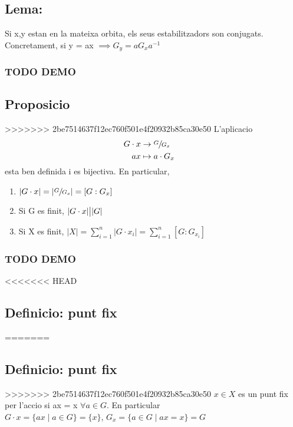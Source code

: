 \documentclass[11pt]{article}
\begin{document}
\subsection{Lema:}
\label{sec:org4fe2954}
Si x,y estan en la mateixa orbita, els seus estabilitzadors son conjugats. \\
Concretament, si y = ax \(\implies G_y = aG_{x}a^{-1}\)
\subsubsection{{\bfseries\sffamily TODO} DEMO}
\label{sec:org1b3bc38}

\subsection{Proposicio}
\label{sec:orgd7f6323}
>>>>>>> 2be7514637f12ec760f501e4f20932b85ca30e50
L'aplicacio
\begin{alignat*}{3}
G \cdot x &\to \sfrac{G}{G_x}& \\
ax &\mapsto a\cdot G_x&
\end{alignat*}
esta ben definida i es bijectiva. En particular, \\
\begin{enumerate}
\item \(\lvert G \cdot x \rvert = \lvert \sfrac{G}{G_x} \rvert = [G:G_x]\)
\item Si G es finit, \(\lvert G \cdot x \rvert \big{|} \lvert G \rvert\)
\item Si X es finit, \(\lvert X \rvert = \sum_{i=1}^{n} \lvert G \cdot x_i \rvert = \sum_{i=1}^n [G:G_{x_i}]\)
\end{enumerate}
\subsubsection{{\bfseries\sffamily TODO} DEMO}
<<<<<<< HEAD
\label{sec:org4bd6d51}

\subsection{Definicio: punt fix}
\label{sec:orgeb2b6a7}
=======
\label{sec:orgbebfc58}

\subsection{Definicio: punt fix}
\label{sec:org622c517}
>>>>>>> 2be7514637f12ec760f501e4f20932b85ca30e50
\(x \in X\) es un punt fix per l'accio si ax = x \(\forall a \in G\). En particular\\
\(G \cdot x = \{ax \mid a \in G\} = \{x\}\), \(G_x = \{ a \in G \mid ax = x \} = G\)
\end{document}
